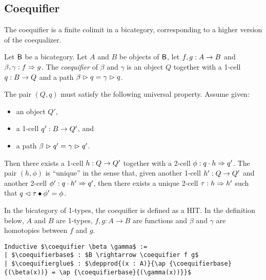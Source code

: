 \subsection{Coequifier}
\label{sec:coequifier}

The coequifier is a finite colimit in a bicategory, corresponding to a
higher version of the coequalizer.

\begin{definition}
Let $\mathsf{B}$ be a bicategory. Let $A$ and $B$ be objects of $\mathsf{B}$, let $f,
g : A \rightarrow B$ and $\beta,\gamma : f \Rightarrow
g$. The \emph{coequifier} of $\beta$ and $\gamma$ is an object $Q$
together with a 1-cell $q : B \rightarrow Q$ and a path
$\beta \vartriangleright q = \gamma \vartriangleright q$.

The pair $(Q,q)$ must satisfy the following universal
property. Assume given:
\begin{itemize}
\item an object $Q'$,
\item a 1-cell $q' : B \rightarrow Q'$, and
\item a path $\beta \vartriangleright q' = \gamma \vartriangleright q'$.
\end{itemize}
Then there exists a 1-cell $h : Q \rightarrow Q'$ together with a 2-cell
$\phi : q \cdot h \Rightarrow q'$. The pair $(h,\phi)$ is ``unique'' in the sense that,
given another 1-cell $h' : Q \rightarrow Q'$ and another 2-cell $\phi' :
q \cdot h' \Rightarrow q'$, then there exists a unique 2-cell $\tau : h
\Rightarrow h'$ such that $q \vartriangleleft \tau \bullet \phi' = \phi$.
\end{definition}


In the bicategory of 1-types, the coequifier is defined as a HIT.  In
the definition below, $A$ and $B$ are 1-types, $f , g: A \to B$ are
functions and $\beta$ and $\gamma$ are homotopies between $f$ and $g$.
\begin{lstlisting}[mathescape=true]
Inductive $\coequifier \beta \gamma$ :=
| $\coequifierbase$ : $B \rightarrow \coequifier f g$
| $\coequifierglue$ : $\depprod{(x : A)}{\ap {\coequifierbase}{(\beta(x))} = \ap {\coequifierbase}{(\gamma(x))}}$
\end{lstlisting}

